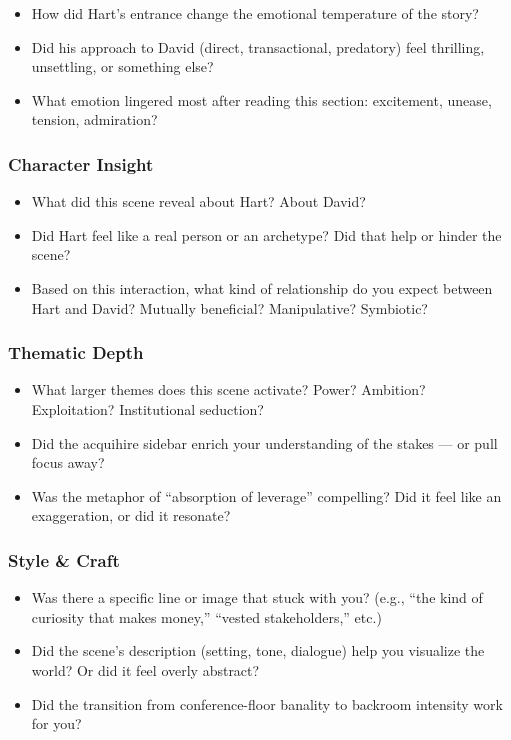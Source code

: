 \begin{itemize}
  \item How did Hart’s entrance change the emotional temperature of the story?
  \item Did his approach to David (direct, transactional, predatory) feel thrilling, unsettling, or something else?
  \item What emotion lingered most after reading this section: excitement, unease, tension, admiration?
\end{itemize}

\subsubsection{Character Insight}

\begin{itemize}
  \item What did this scene reveal about Hart? About David?
  \item Did Hart feel like a real person or an archetype? Did that help or hinder the scene?
  \item Based on this interaction, what kind of relationship do you expect between Hart and David? Mutually beneficial? Manipulative? Symbiotic?
\end{itemize}

\subsubsection{Thematic Depth}

\begin{itemize}
  \item What larger themes does this scene activate? Power? Ambition? Exploitation? Institutional seduction?
  \item Did the acquihire sidebar enrich your understanding of the stakes — or pull focus away?
  \item Was the metaphor of “absorption of leverage” compelling? Did it feel like an exaggeration, or did it resonate?
\end{itemize}

\subsubsection{Style \& Craft}

\begin{itemize}
  \item Was there a specific line or image that stuck with you? (e.g., “the kind of curiosity that makes money,” “vested stakeholders,” etc.)
  \item Did the scene’s description (setting, tone, dialogue) help you visualize the world? Or did it feel overly abstract?
  \item Did the transition from conference-floor banality to backroom intensity work for you?
\end{itemize}

